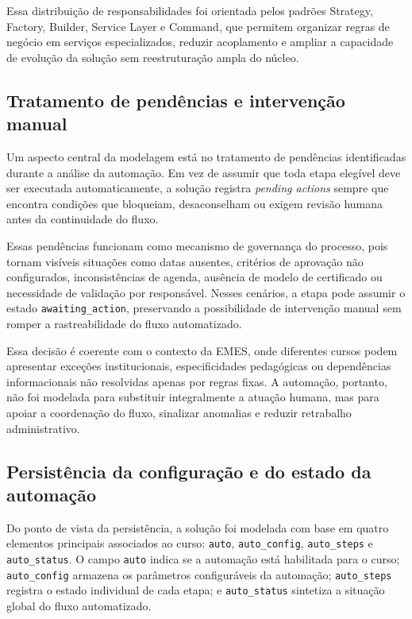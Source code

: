 Essa distribuição de responsabilidades foi orientada pelos padrões
Strategy, Factory, Builder, Service Layer e Command, que permitem
organizar regras de negócio em serviços especializados, reduzir
acoplamento e ampliar a capacidade de evolução da solução sem
reestruturação ampla do núcleo.

\subsection{Tratamento de pendências e intervenção manual}
\label{sec:metod:modelagem:pendencias}

Um aspecto central da modelagem está no tratamento de pendências
identificadas durante a análise da automação. Em vez de assumir que toda
etapa elegível deve ser executada automaticamente, a solução registra
\textit{pending actions} sempre que encontra condições que bloqueiam,
desaconselham ou exigem revisão humana antes da continuidade do fluxo.

Essas pendências funcionam como mecanismo de governança do processo,
pois tornam visíveis situações como datas ausentes, critérios de
aprovação não configurados, inconsistências de agenda, ausência de
modelo de certificado ou necessidade de validação por responsável.
Nesses cenários, a etapa pode assumir o estado
\texttt{awaiting\_action}, preservando a possibilidade de intervenção
manual sem romper a rastreabilidade do fluxo automatizado.

Essa decisão é coerente com o contexto da EMES, onde diferentes cursos
podem apresentar exceções institucionais, especificidades pedagógicas ou
dependências informacionais não resolvidas apenas por regras fixas. A
automação, portanto, não foi modelada para substituir integralmente a
atuação humana, mas para apoiar a coordenação do fluxo, sinalizar
anomalias e reduzir retrabalho administrativo.

\subsection{Persistência da configuração e do estado da automação}
\label{sec:metod:modelagem:persistencia}

Do ponto de vista da persistência, a solução foi modelada com base em
quatro elementos principais associados ao curso: \texttt{auto},
\texttt{auto\_config}, \texttt{auto\_steps} e \texttt{auto\_status}. O
campo \texttt{auto} indica se a automação está habilitada para o curso;
\texttt{auto\_config} armazena os parâmetros configuráveis da automação;
\texttt{auto\_steps} registra o estado individual de cada etapa; e
\texttt{auto\_status} sintetiza a situação global do fluxo automatizado.

